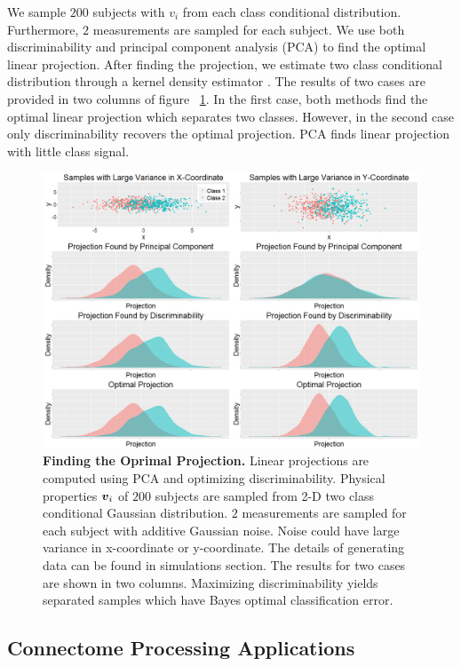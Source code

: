 \documentclass{article}
\begin{document}
We sample $200$ subjects with $v_i$ from each class conditional distribution. Furthermore, $2$ measurements are sampled for each subject. We use both discriminability and principal component analysis (PCA) \cite{jolliffe2002principal} to find the optimal linear projection. After finding the projection, we estimate two class conditional distribution through a kernel density estimator \cite{silverman1986density}. The results of two cases are provided in two columns of figure ~\ref{fig:simu2}. In the first case, both methods find the optimal linear projection which separates two classes. However, in the second case only discriminability recovers the optimal projection. PCA finds linear projection with little class signal.
\begin{figure}[ht!]
	\includegraphics[width=\linewidth]{../Figs/simu2.png}
	\caption{{\bf Finding the Oprimal Projection.} Linear projections are computed using PCA and optimizing discriminability. Physical properties $\boldsymbol{v}_i$ of $200$ subjects are sampled from 2-D two class conditional Gaussian distribution. $2$ measurements are sampled for each subject with additive Gaussian noise. Noise could have large variance in x-coordinate or y-coordinate. The details of generating data can be found in simulations section. The results for two cases are shown in two columns. Maximizing discriminability yields separated samples which have Bayes optimal classification error.}
	\label{fig:simu2}
\end{figure}



\subsection{Connectome Processing Applications}
\end{document}
